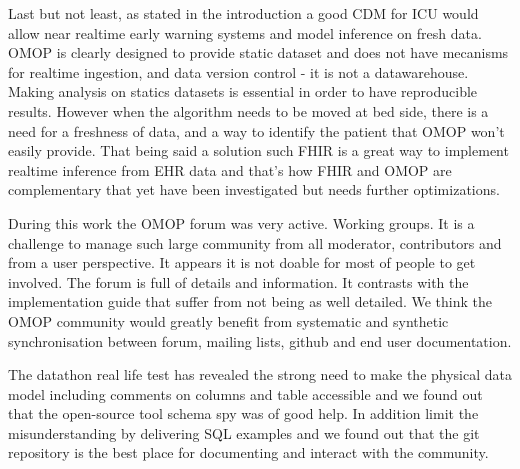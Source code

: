 Last but not least, as stated in the introduction a good CDM for ICU would
allow near realtime early warning systems and model inference on fresh data.
OMOP is clearly designed to provide static dataset and does not have mecanisms
for realtime ingestion, and data version control - it is not a datawarehouse.
Making analysis on statics datasets is essential in order to have reproducible
results. However when the algorithm needs to be moved at bed side, there is a
need for a freshness of data, and a way to identify the patient that OMOP won't
easily provide. That being said a solution such FHIR is a great way to
implement realtime inference from EHR data and that's how FHIR and OMOP are
complementary that yet have been investigated \cite{gatech} but needs further
optimizations.

During this work the OMOP forum was very active. Working groups.  It is a
challenge to manage such large community from all moderator, contributors and
from a user perspective. It appears it is not doable for most of people to get
involved. The forum is full of details and information. It contrasts with the
implementation guide that suffer from not being as well detailed. We think the
OMOP community would greatly benefit from systematic and synthetic
synchronisation between forum, mailing lists,  github and end user
documentation.

The datathon real life test has revealed the strong need to make the physical
data model including comments on columns and table accessible and we found out
that the open-source tool schema spy was of good help. In addition limit the
misunderstanding by delivering SQL examples and we found out that the git
repository is the best place for documenting and interact with the community.

